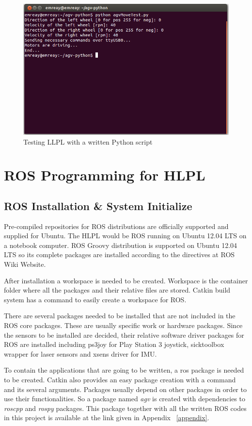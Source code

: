	\begin{figure}[h]
		\centering
		\includegraphics[scale=0.65]{images/testScript}
		\caption{Testing LLPL with a written Python script}
		\label{fig:testScript}
	\end{figure}
	
\section{ROS Programming for HLPL}
\label{sec:programming for hlpl}

	\subsection{ROS Installation \& System Initialize}
	\label{subsec:ros install and init}
	Pre-compiled repositories for ROS distributions are officially supported and supplied for Ubuntu. The HLPL would be ROS running on Ubuntu 12.04 LTS on a notebook computer. ROS Groovy distribution is supported on Ubuntu 12.04 LTS so its complete packages are installed according to the directives at ROS Wiki Website. 
	\par
	After installation a workspace is needed to be created. Workspace is the container folder where all the packages and their relative files are stored. Catkin build system has a command to easily create a workspace for ROS. 
	\par
	There are several packages needed to be installed that are not included in the ROS core packages. These are usually specific work or hardware packages. Since the sensors to be installed are decided, their relative software driver packages for ROS are installed including ps3joy for Play Station 3 joystick, sicktoolbox wrapper for laser sensors and xsens driver for IMU. 
	\par
	To contain the applications that are going to be written, a ros package is needed to be created. Catkin also provides an easy package creation with a command and its several arguments. Packages usually depend on other packages in order to use their functionalities. So a package named \textit{agv} is created with dependencies to \textit{roscpp} and \textit{rospy} packages. This package together with all the written ROS codes in this project is available at the link given in Appendix ~\ref{appendix}.
